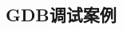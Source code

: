 \documentclass[class=book, crop=false]{standalone}
\begin{document}
\begin{CJK}{UTF8}{gbsn}

\chapter{GDB调试案例}



\cleardoublepage

\end{CJK}
\end{document}
